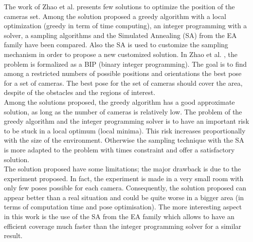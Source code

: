 The work of Zhao et al. \cite{151*zhao2013} presents few solutions to optimize the position of the cameras set. Among the solution proposed a greedy algorithm with a local optimization (greedy in term of time computing), an integer programming with a solver, a sampling algorithms and the Simulated Annealing (SA) from the EA family have been compared. Also the SA is used to customize the sampling mechanism in order to propose a new customized solution. 
In Zhao et al. \cite{151*zhao2013}, the problem is formalized as a BIP (binary integer programming).
  The goal is to find among a restricted numbers of possible positions and orientations the best pose for a set of cameras. The best pose for the set of cameras should cover the area, despite of the obstacles and the regions of interest. \\
Among the solutions proposed, the greedy algorithm has a good approximate solution, as long as the number of cameras is relatively low. The problem of the greedy algorithm and the integer programming solver is to have an important risk to be stuck in a local optimum (local minima). This risk increases proportionally with the size of the environment. Otherwise the sampling technique with the SA is more adapted to the problem with times constraint and offer a satisfactory solution.\\
The solution proposed have some limitations; the major drawback is due to the experiment proposed. In fact, the experiment is made in a very small room with only few poses possible for each camera. Consequently, the solution proposed can appear better than a real situation and could be quite worse in a bigger area (in terms of computation time  and pose optimisation). The more interesting aspect in this work \citep{151*zhao2013} is the use of the SA from the EA family which allows to have an efficient coverage much faster than the integer programming solver for a similar result. 

